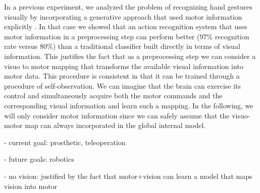 In a previous experiment, we analyzed the problem of recognizing hand gestures visually
by incorporating a generative approach that used motor information explicitly 
\cite{lopes-05,metta-06}.
In that case we showed that an action recognition system that uses motor information in
a preprocessing step can perform better ($97\%$ recognition rate versus $80\%$) than a 
traditional classifier built directly in terms of visual information. This justifies 
the fact that as a preprocessing step we can consider a visuo to motor mapping that 
transforms the available visual information into motor data. This procedure is consistent 
in that it can be trained through a procedure of self-observation. We can imagine that 
the brain can exercise its control and simultaneously acquire both the motor commands and 
the corresponding visual information and learn such a mapping. In the following, we 
will only consider motor information since we can safely assume that the visuo-motor map
can always incorporated in the global internal model.



- current goal: prosthetic, teleoperation

- future goals: robotics

- no vision: justified by the fact that motor+vision can learn a model that maps vision into motor



